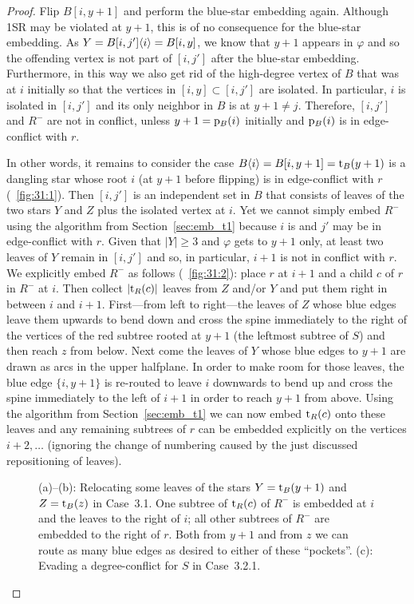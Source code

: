 \documentclass[11pt,a4paper,colorlinks=true,urlcolor=blue,citecolor=red]{article}
\theoremstyle{plain}
\begin{document}
\begin{proof}
  Flip $B[i,y+1]$ and perform the blue-star embedding again. Although
  1SR may be violated at $y+1$, this is of no consequence for the
  blue-star embedding. As $Y=B{[i,j']}\langle{i}\rangle=B[i,y]$, we know that
  $y+1$ appears in $\varphi$ and so the offending vertex is not part of
  $[i,j']$ after the blue-star embedding. Furthermore, in this way we
  also get rid of the high-degree vertex of $B$ that was at $i$
  initially so that the vertices in $[i,y]\subset[i,j']$ are isolated.
  In particular, $i$ is isolated in $[i,j']$ and its only neighbor in
  $B$ is at $y+1\ne j$. Therefore, $[i,j']$ and $R^-$ are not in
  conflict, unless $y+1=\mathrm p_B(i)$ initially and $\mathrm p_B(i)$ is in
  edge-conflict with $r$.

  In other words, it remains to consider the case $B\langle{i}\rangle=B[i,y+1]=\mathrm t_B(y+1)$ is a dangling star whose root $i$ (at
  $y+1$ before flipping) is in edge-conflict with $r$
  (\figurename~\ref{fig:31:1}).
Then $[i,j']$ is an independent set in $B$ that consists of leaves of
  the two stars $Y$ and $Z$ plus the isolated vertex at $i$. Yet we
  cannot simply embed $R^-$ using the algorithm from
  Section~\ref{sec:emb_t1} because $i$ is and $j'$ may be in
  edge-conflict with $r$. Given that $|Y|\ge 3$ and $\varphi$ gets to
  $y+1$ only, at least two leaves of $Y$ remain in $[i,j']$ and so, in
  particular, $i+1$ is not in conflict with $r$. We explicitly embed
  $R^-$ as follows (\figurename~\ref{fig:31:2}): place $r$ at $i+1$ and
  a child $c$ of $r$ in $R^-$ at $i$. Then collect $|\mathrm t_R(c)|$ leaves
  from $Z$ and/or $Y$ and put them right in between $i$ and $i+1$.
  First---from left to right---the leaves of $Z$ whose blue edges leave
  them upwards to bend down and cross the spine immediately to the right
  of the vertices of the red subtree rooted at $y+1$ (the leftmost subtree of $S$) and then
  reach $z$ from below. Next come the leaves of $Y$ whose blue edges to
  $y+1$ are drawn as arcs in the upper halfplane. In order to make room
  for those leaves, the blue edge $\{i,y+1\}$ is re-routed to leave $i$
  downwards to bend up and cross the spine immediately to the left of
  $i+1$ in order to reach $y+1$ from above. Using the algorithm from
  Section~\ref{sec:emb_t1} we can now embed $\mathrm t_R(c)$ onto these leaves
  and any remaining subtrees of $r$ can be embedded explicitly
  on the vertices $i+2,\ldots$ (ignoring the change of numbering caused
  by the just discussed repositioning of leaves).
\begin{figure}[htbp]
    \centering \subfloat[]{\texttt{[image: c31-0]}\label{fig:31:1}}\hfil
    \subfloat[]{\texttt{[image: c31-1]}\label{fig:31:2}}\hfil
    \subfloat[]{\texttt{[image: c3221]}\label{fig:gen_322}}\hfil
    \caption{(a)--(b): Relocating some leaves of the stars
      $Y=\mathrm t_B(y+1)$ and $Z=\mathrm t_B(z)$ in Case~3.1. One subtree of
      $\mathrm t_R(c)$ of $R^-$ is embedded at $i$ and the leaves to the right
      of $i$; all other subtrees of $R^-$ are embedded to the right of
      $r$. Both from $y+1$ and from $z$ we can route as many blue edges
      as desired to either of these ``pockets''. (c): Evading a
      degree-conflict for $S$ in Case~3.2.1.\label{fig:31}}
  \end{figure}



\end{proof}
\end{document}
